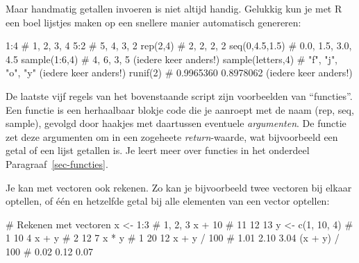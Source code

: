 \documentclass[
  a4paper,
]{scrbook}
\newenvironment{Shaded}{\begin{snugshade}}{\end{snugshade}}
\newcommand{\CommentTok}[1]{\textcolor[rgb]{0.37,0.37,0.37}{#1}}
\newcommand{\DecValTok}[1]{\textcolor[rgb]{0.68,0.00,0.00}{#1}}
\newcommand{\FloatTok}[1]{\textcolor[rgb]{0.68,0.00,0.00}{#1}}
\newcommand{\FunctionTok}[1]{\textcolor[rgb]{0.28,0.35,0.67}{#1}}
\newcommand{\NormalTok}[1]{\textcolor[rgb]{0.00,0.23,0.31}{#1}}
\newcommand{\OtherTok}[1]{\textcolor[rgb]{0.00,0.23,0.31}{#1}}
\newcommand{\SpecialCharTok}[1]{\textcolor[rgb]{0.37,0.37,0.37}{#1}}
\theoremstyle{definition}
\theoremstyle{remark}
\begin{document}
Maar handmatig getallen invoeren is niet altijd handig. Gelukkig kun je
met R een boel lijstjes maken op een snellere manier automatisch
genereren:

\begin{Shaded}
\begin{Highlighting}[]
\DecValTok{1}\SpecialCharTok{:}\DecValTok{4}                \CommentTok{\# 1, 2, 3, 4}
\DecValTok{5}\SpecialCharTok{:}\DecValTok{2}                \CommentTok{\# 5, 4, 3, 2}
\FunctionTok{rep}\NormalTok{(}\DecValTok{2}\NormalTok{,}\DecValTok{4}\NormalTok{)           }\CommentTok{\# 2, 2, 2, 2}
\FunctionTok{seq}\NormalTok{(}\DecValTok{0}\NormalTok{,}\FloatTok{4.5}\NormalTok{,}\FloatTok{1.5}\NormalTok{)     }\CommentTok{\# 0.0, 1.5, 3.0, 4.5}
\FunctionTok{sample}\NormalTok{(}\DecValTok{1}\SpecialCharTok{:}\DecValTok{6}\NormalTok{,}\DecValTok{4}\NormalTok{)      }\CommentTok{\# 4, 6, 3, 5 (iedere keer anders!)}
\FunctionTok{sample}\NormalTok{(letters,}\DecValTok{4}\NormalTok{)  }\CommentTok{\# "f", "j", "o", "y" (iedere keer anders!)}
\FunctionTok{runif}\NormalTok{(}\DecValTok{2}\NormalTok{)           }\CommentTok{\# 0.9965360 0.8978062 (iedere keer anders!)}
\end{Highlighting}
\end{Shaded}

De laatste vijf regels van het bovenstaande script zijn voorbeelden van
``functies''. Een functie is een herhaalbaar blokje code die je aanroept
met de naam (rep, seq, sample), gevolgd door haakjes met daartussen
eventuele \emph{argumenten}. De functie zet deze argumenten om in een
zogeheete \emph{return}-waarde, wat bijvoorbeeld een getal of een lijst
getallen is. Je leert meer over functies in het onderdeel
Paragraaf~\ref{sec-functies}.

Je kan met vectoren ook rekenen. Zo kan je bijvoorbeeld twee vectoren
bij elkaar optellen, of één en hetzelfde getal bij alle elementen van
een vector optellen:

\begin{Shaded}
\begin{Highlighting}[]
\CommentTok{\# Rekenen met vectoren}
\NormalTok{x }\OtherTok{\textless{}{-}} \DecValTok{1}\SpecialCharTok{:}\DecValTok{3}           \CommentTok{\# 1, 2, 3}
\NormalTok{x }\SpecialCharTok{+} \DecValTok{10}             \CommentTok{\# 11 12 13}
\NormalTok{y }\OtherTok{\textless{}{-}} \FunctionTok{c}\NormalTok{(}\DecValTok{1}\NormalTok{, }\DecValTok{10}\NormalTok{, }\DecValTok{4}\NormalTok{)   }\CommentTok{\# 1 10 4}
\NormalTok{x }\SpecialCharTok{+}\NormalTok{ y              }\CommentTok{\# 2 12  7}
\NormalTok{x }\SpecialCharTok{*}\NormalTok{ y              }\CommentTok{\# 1 20 12}
\NormalTok{x }\SpecialCharTok{+}\NormalTok{ y }\SpecialCharTok{/} \DecValTok{100}        \CommentTok{\# 1.01 2.10 3.04}
\NormalTok{(x }\SpecialCharTok{+}\NormalTok{ y) }\SpecialCharTok{/} \DecValTok{100}      \CommentTok{\# 0.02 0.12 0.07}
\end{Highlighting}
\end{Shaded}
\end{document}
